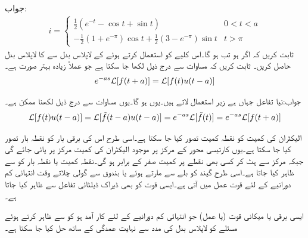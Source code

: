 جواب:
\begin{align*}
i=
\begin{cases}
\tfrac{1}{2}(e^{-t}-\cos t+\sin t) & 0<t<a\\
-\tfrac{1}{2}(1+e^{-\pi})\cos t+\tfrac{1}{2}(3-e^{-\pi})\sin t& t>\pi
\end{cases}
\end{align*}
ثابت کریں کہ اگر  ہو تب  ہو گا۔اس کلیے کو استعمال کرتے ہوئے  کے لاپلاس بدل سے  کا لاپلاس بدل حاصل کریں۔
ثابت کریں کہ مساوات  سے درج ذیل لکھا جا سکتا ہے جو عملاً زیادہ بہتر صورت ہے۔
\begin{align}
e^{-as}\mathcal{L}[f(t+a)]=\mathcal{L}[f(t)u(t-a)]
\end{align}

جواب:نیا تفاعل  جہاں  ہے زیر استعمال لاتے ہیں۔یوں  ہو گا۔یوں مساوات  سے درج ذیل لکھنا ممکن ہے۔
\begin{align*}
\mathcal{L}[f(t)u(t-a)]=\mathcal{L}[\tilde{f}(t-a)u(t-a)]=e^{-as}\mathcal{L}[\tilde{f}(t)]=e^{-as}\mathcal{L}[f(t+a)]
\end{align*}

الیکٹران کی کمیت کو نقطہ کمیت تصور کیا جا سکتا ہے۔اسی طرح اس کی برقی بار کو نقطہ بار تصور کیا جا سکتا ہے۔یوں کارتیسی محور کے مرکز پر موجود الیکٹران کی کمیت مرکز پر پائی جائے گی جبکہ مرکز سے ہٹ کر کسی بھی نقطے پر کمیت صفر کے برابر ہو گی۔نقطہ کمیت یا نقطہ بار کو  سے ظاہر کیا جاتا ہے۔اسی طرح گیند کو بلے سے مارتے ہوئے یا بندوق سے گولی چلاتے وقت  انتہائی کم دورانیے کے لئے قوت عمل میں آتی ہے۔ایسی قوت کو بھی ڈیراک ڈیلٹائی تفاعل سے ظاہر کیا جاتا ہے۔

ایسی برقی یا میکانی قوت (یا عمل) جو انتہائی کم دورانیے کے لئے کار آمد ہو کو  سے ظاہر کرتے ہوئے  مسئلے کو لاپلاس بدل کی مدد سے نہایت عمدگی کے ساتھ حل کیا جا سکتا ہے۔

